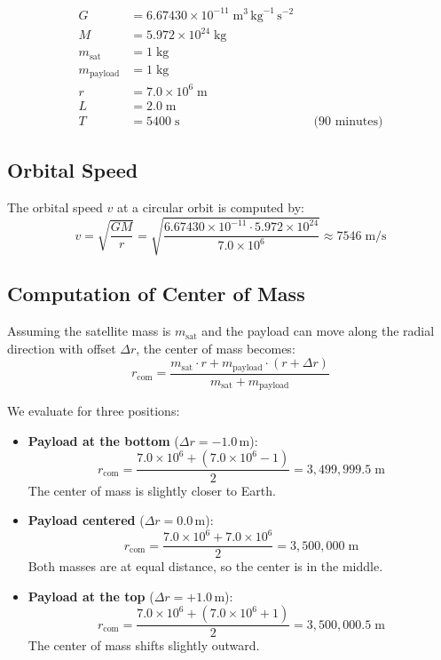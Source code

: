 \documentclass[conference]{IEEEtran}
\begin{document}
\begin{align*}
G &= 6.67430 \times 10^{-11} \; \text{m}^3\,\text{kg}^{-1}\,\text{s}^{-2} \\
M &= 5.972 \times 10^{24} \; \text{kg}  \\
m_\text{sat} &= 1 \; \text{kg}  \\
m_\text{payload} &= 1 \; \text{kg} \\
r &= 7.0 \times 10^6 \; \text{m}  \\
L &= 2.0 \; \text{m}  \\
T &= 5400 \; \text{s} && \text{(90 minutes)}
\end{align*}

\subsection{Orbital Speed}
The orbital speed $v$ at a circular orbit is computed by:
\[
v = \sqrt{\frac{GM}{r}} = \sqrt{\frac{6.67430 \times 10^{-11} \cdot 5.972 \times 10^{24}}{7.0 \times 10^6}} \approx 7546 \; \text{m/s}
\]

\subsection{Computation of Center of Mass}
Assuming the satellite mass is $m_\text{sat}$ and the payload can move along the radial direction with offset $\Delta r$, the center of mass becomes:
\[
r_\text{com} = \frac{m_\text{sat} \cdot r + m_\text{payload} \cdot (r + \Delta r)}{m_\text{sat} + m_\text{payload}}
\]

We evaluate for three positions:

\begin{itemize}
  \item \textbf{Payload at the bottom} ($\Delta r = -1.0 \, \text{m}$):
  \[
  r_\text{com} = \frac{7.0 \times 10^6 + (7.0 \times 10^6 - 1)}{2} = 3,499,999.5 \; \text{m}
  \]
  The center of mass is slightly closer to Earth.

  \item \textbf{Payload centered} ($\Delta r = 0.0 \, \text{m}$):
  \[
  r_\text{com} = \frac{7.0 \times 10^6 + 7.0 \times 10^6}{2} = 3,500,000 \; \text{m}
  \]
  Both masses are at equal distance, so the center is in the middle.

  \item \textbf{Payload at the top} ($\Delta r = +1.0 \, \text{m}$):
  \[
  r_\text{com} = \frac{7.0 \times 10^6 + (7.0 \times 10^6 + 1)}{2} = 3,500,000.5 \; \text{m}
  \]
  The center of mass shifts slightly outward.
\end{itemize}
\end{document}
